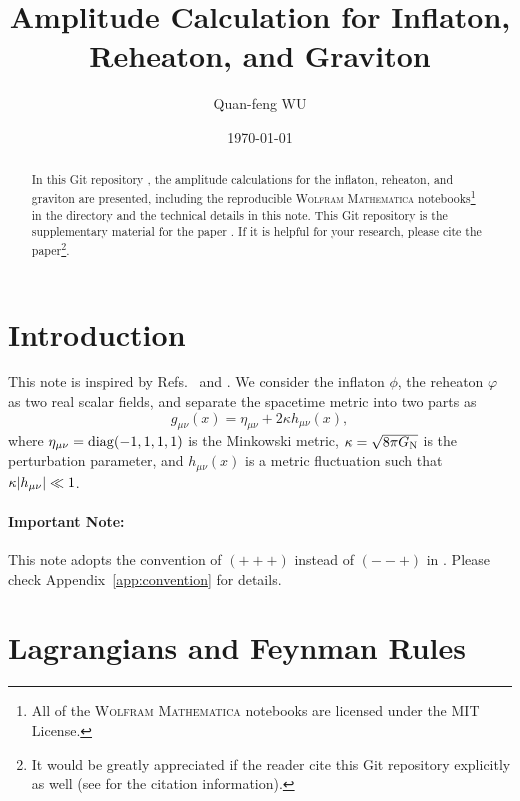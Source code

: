 \documentclass{article}
\title{Amplitude Calculation for Inflaton, Reheaton, and Graviton}
\author{Quan-feng WU\email{wuquanfeng@ihep.ac.cn}}
\affil{
    Institute of High Energy Physics, Chinese Academy of Sciences, \\
    Beijing 100049, CHINA
}
\date{\today\license}
\begin{document}
    \maketitle

    \begin{abstract}
        In this Git repository \cite{Wu:2025_amp-inflaton-reheaton-graviton}, the amplitude calculations for the inflaton, reheaton, and graviton are presented, including the reproducible \textsc{Wolfram Mathematica} notebooks\footnote{All of the \textsc{Wolfram Mathematica} notebooks are licensed under the MIT License.} in the directory  and the technical details in this note.
        This Git repository is the supplementary material for the paper .
        If it is helpful for your research, please cite the paper\footnote{It would be greatly appreciated if the reader cite this Git repository explicitly as well (see \githubsrc[README.md] for the citation information).}.
    \end{abstract}
    \noindent\hrulefill

    \tableofcontents
    \clearpage

    \section{Introduction}

        This note is inspired by Refs.~\cite{Basile:2024oms} and \cite{Tokareva:2024_graviton}.
        We consider the inflaton $\phi$, the reheaton $\varphi$ as two real scalar fields, and separate the spacetime metric into two parts as \cite[Eq.~(2.13)]{Basile:2024oms}
        \begin{equation}
            g_{\mu\nu}(x) = \eta_{\mu\nu} + 2 \kappa h_{\mu\nu}(x),
        \end{equation}
        where $\eta_{\mu\nu} = \operatorname{diag}(-1, 1, 1, 1)$ is the Minkowski metric, $\kappa = \sqrt{8 \pi G_\mathrm{N}}$ is the perturbation parameter, and $h_{\mu\nu}(x)$ is a metric fluctuation such that $\kappa \abs{h_{\mu\nu}} \ll 1$.

        \paragraph{Important Note:}
        This note adopts the convention of $(+ + +)$ instead of $(- - +)$ in .
        Please check Appendix~\ref{app:convention} for details.

    \section{Lagrangians and Feynman Rules}
\end{document}
